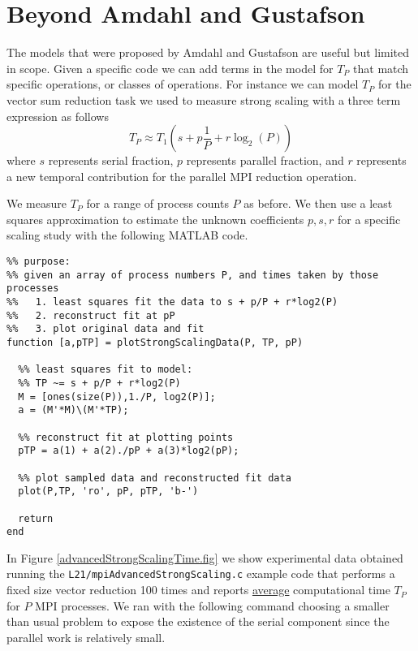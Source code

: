 \section{Beyond Amdahl and Gustafson}

The models that were proposed by Amdahl and Gustafson are useful but limited in scope. Given a specific code we can add terms in the model for $T_P$ that match specific operations, or classes of operations. For instance we can model $T_P$ for the vector sum reduction task we used to measure strong scaling with a three term expression as follows
\[
T_P \approx T_1\left(s + p\frac{1}{P} + r\log_2(P)\right)
\]
where $s$ represents serial fraction, $p$ represents parallel fraction, and $r$ represents a new temporal contribution for the parallel MPI reduction operation. 

We measure $T_P$ for a range of process counts $P$ as before. We then use a least squares approximation to estimate the unknown coefficients $p,s,r$ for a specific scaling study with the following MATLAB code.

\begin{verbatim}
%% purpose:
%% given an array of process numbers P, and times taken by those processes
%%   1. least squares fit the data to s + p/P + r*log2(P)
%%   2. reconstruct fit at pP
%%   3. plot original data and fit
function [a,pTP] = plotStrongScalingData(P, TP, pP)

  %% least squares fit to model:
  %% TP ~= s + p/P + r*log2(P) 
  M = [ones(size(P)),1./P, log2(P)];
  a = (M'*M)\(M'*TP);

  %% reconstruct fit at plotting points
  pTP = a(1) + a(2)./pP + a(3)*log2(pP);

  %% plot sampled data and reconstructed fit data
  plot(P,TP, 'ro', pP, pTP, 'b-')

  return
end
\end{verbatim}

In Figure \ref{advancedStrongScalingTime.fig} we show experimental data obtained running the \texttt{L21/mpiAdvancedStrongScaling.c} example code that performs a fixed size vector reduction 100 times and reports \underline{average} computational time $T_P$ for $P$ MPI processes. We ran with the following command choosing a smaller than usual problem to expose the existence of the serial component since the parallel work is relatively small.


